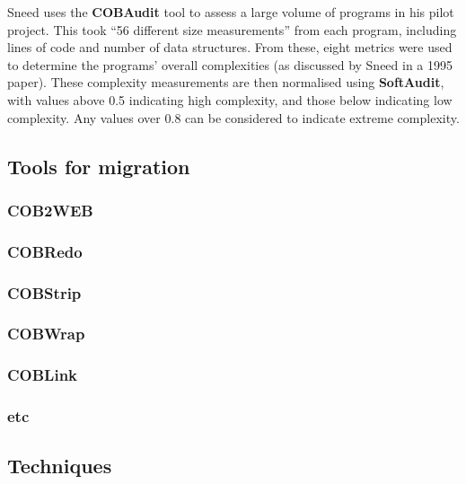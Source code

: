 \documentclass[12pt,journal,compsoc]{IEEEtran}
\begin{document}
Sneed\cite{Sneed2009} uses the \textbf{COBAudit} tool to assess a large volume of programs in his pilot project. This took ``56 different size measurements''\cite{Sneed2009} from each program, including lines of code and number of data structures. From these, eight metrics were used to determine the programs' overall complexities (as discussed by Sneed in a 1995 paper\cite{Sneed1995}). These complexity measurements are then normalised using \textbf{SoftAudit}, with values above 0.5 indicating high complexity, and those below indicating low complexity. Any values over 0.8 can be considered to indicate extreme complexity.

\subsection{Tools for migration}
\label{subsec:toolsmigration}

\subsubsection{COB2WEB}
\label{subsubsec:cob2web}

\subsubsection{COBRedo}
\label{subsubsec:cobredo}

\subsubsection{COBStrip}
\label{subsubsec:cobstrip}

\subsubsection{COBWrap}
\label{subsubsec:cobwrap}

\subsubsection{COBLink}
\label{subsubsec:coblink}

\subsubsection{etc}

\subsection{Techniques}
\label{subsec:techniques}
\end{document}
